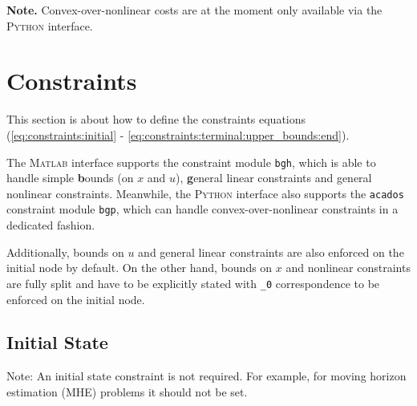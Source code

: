 \documentclass[english]{article}
\newcommand{\code}[1]{\texttt{#1}}
\newcommand{\str}[1]{\texttt{'#1'}}
\newcommand{\acados}{\texttt{acados}}
\newcommand{\matlab}{\textsc{Matlab}}
\newcommand{\python}{\textsc{Python}}
\begin{document}
\textbf{Note.} Convex-over-nonlinear costs are at the moment only available via the \python{} interface.
\section{Constraints}\label{sec:constraints}
%
This section is about how to define the constraints equations (\ref{eq:constraints:initial} - \ref{eq:constraints:terminal:upper_bounds:end}).

The \matlab{} interface supports the constraint module \code{bgh}, which is able to handle simple \textbf{b}ounds (on $ x $ and $ u $), \textbf{g}eneral linear constraints and general nonlinear constraints.
Meanwhile, the \python{} interface also supports the \acados{} constraint module \code{bgp}, which can handle convex-over-nonlinear constraints in a dedicated fashion.

Additionally, bounds on $u$ and general linear constraints are also enforced on the initial node by default. On the other hand, bounds on $x$ and nonlinear constraints are fully split and have to be explicitly stated with \code{\_0} correspondence to be enforced on the initial node.

%
\subsection{Initial State}\label{sec:constraints:initial}
%
Note: An initial state constraint is not required.
For example, for moving horizon estimation (MHE) problems it should not be set.
\end{document}
